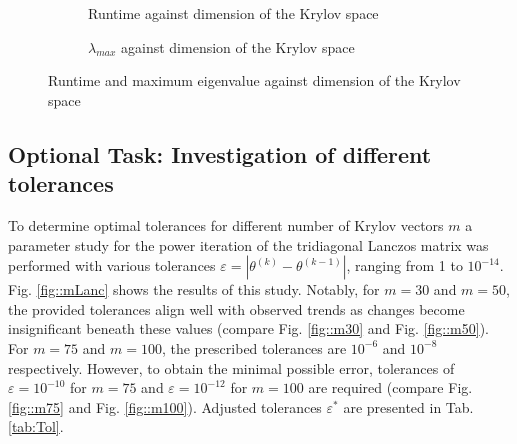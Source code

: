 \documentclass[11pt,a4paper]{article}
\newcommand{\refFig}[1]{Fig. \ref{#1}}
\newcommand{\refTab}[1]{Tab. \ref{#1}}
\begin{document}
\begin{figure}[h!]
	\centering
	\begin{subfigure}[h!]{.49\textwidth}
		\begin{center}
			\resizebox{0.52\width}{!}{}
			\caption{Runtime against dimension of the Krylov space}
			\label{fig::Lanc1}
		\end{center}	
	\end{subfigure}
	\hfill
	\begin{subfigure}[h!]{.49\textwidth}
		\centering
		\resizebox{0.52\width}{!}{}
		\caption{$\lambda_{max}$ against dimension of the Krylov space}
		\label{fig::Lanc2}
	\end{subfigure}
	\caption{Runtime and maximum eigenvalue against dimension of the Krylov space}
	\label{fig::Lanc}
\end{figure}

\subsection{Optional Task: Investigation of different tolerances}
To determine optimal tolerances for different number of Krylov vectors $m$ a parameter study  for the power iteration of the tridiagonal Lanczos matrix was performed with various tolerances $\varepsilon = |\theta^{(k)} - \theta^{(k-1)}|$, ranging from 1 to $10^{-14}$. \refFig{fig::mLanc} shows the results of this study. Notably, for $m=30$ and $m=50$, the provided tolerances align well with observed trends as changes become insignificant beneath these values (compare \refFig{fig::m30} and \refFig{fig::m50}). For $m=75$ and $m=100$, the prescribed tolerances are $10^{-6}$ and $10^{-8}$ respectively. However, to obtain the minimal possible error, tolerances of  $\varepsilon = 10^{-10}$ for $m=75$ and $\varepsilon = 10^{-12}$ for $m=100$ are required (compare \refFig{fig::m75} and \refFig{fig::m100}). Adjusted tolerances $\varepsilon^*$ are presented in \refTab{tab:Tol}.
\end{document}
